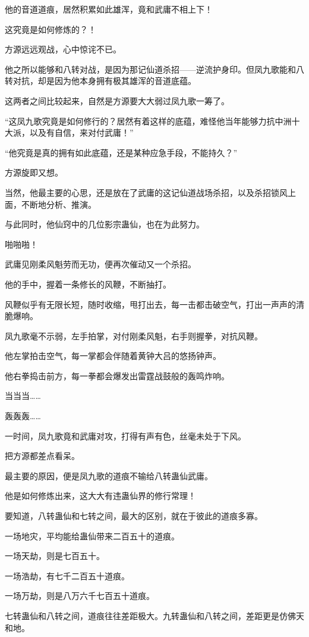 \begin{this_body}
他的音道道痕，居然积累如此雄浑，竟和武庸不相上下！

这究竟是如何修炼的？！

方源远远观战，心中惊诧不已。

他之所以能够和八转对战，是因为那记仙道杀招——逆流护身印。但凤九歌能和八转对抗，却是因为他本身拥有极其雄浑的音道底蕴。

这两者之间比较起来，自然是方源要大大弱过凤九歌一筹了。

“这凤九歌究竟是如何修行的？居然有着这样的底蕴，难怪他当年能够力抗中洲十大派，以及有自信，来对付武庸！”

“他究竟是真的拥有如此底蕴，还是某种应急手段，不能持久？”

方源旋即又想。

当然，他最主要的心思，还是放在了武庸的这记仙道战场杀招，以及杀招锁风上面，不断地分析、推演。

与此同时，他仙窍中的几位影宗蛊仙，也在为此努力。

啪啪啪！

武庸见刚柔风魁劳而无功，便再次催动又一个杀招。

他的手中，握着一条修长的风鞭，不断抽打。

风鞭似乎有无限长短，随时收缩，甩打出去，每一击都击破空气，打出一声声的清脆爆响。

凤九歌毫不示弱，左手拍掌，对付刚柔风魁，右手则握拳，对抗风鞭。

他左掌拍击空气，每一掌都会伴随着黄钟大吕的悠扬钟声。

他右拳捣击前方，每一拳都会爆发出雷霆战鼓般的轰鸣炸响。

当当当……

轰轰轰……

一时间，凤九歌竟和武庸对攻，打得有声有色，丝毫未处于下风。

把方源都差点看呆。

最主要的原因，便是凤九歌的道痕不输给八转蛊仙武庸。

他是如何修炼出来，这大大有违蛊仙界的修行常理！

要知道，八转蛊仙和七转之间，最大的区别，就在于彼此的道痕多寡。

一场地灾，平均能给蛊仙带来二百五十的道痕。

一场天劫，则是七百五十。

一场浩劫，有七千二百五十道痕。

一场万劫，则是八万六千七百五十道痕。

七转蛊仙和八转之间，道痕往往差距极大。九转蛊仙和八转之间，差距更是仿佛天和地。


\end{this_body}
